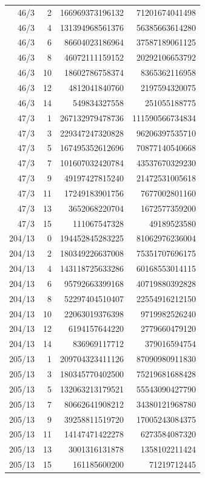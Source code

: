 \begin{longtable}{@{}rrrr@{}}
46/3 & 2 & 166969373196132 & 71201674041498\\
46/3 & 4 & 131394968561376 & 56385663614280\\
46/3 & 6 & 86604023186964 & 37587189061125\\
46/3 & 8 & 46072111159152 & 20292106653792\\
46/3 & 10 & 18602786758374 & 8365362116958\\
46/3 & 12 & 4812041840760 & 2197594320075\\
46/3 & 14 & 549834327558 & 251055188775\\
47/3 & 1 & 267132979478736 & 111590566734834\\
47/3 & 3 & 229347247320828 & 96206397535710\\
47/3 & 5 & 167495352612696 & 70877140540668\\
47/3 & 7 & 101607032420784 & 43537670329230\\
47/3 & 9 & 49197427815240 & 21472531005618\\
47/3 & 11 & 17249183901756 & 7677002801160\\
47/3 & 13 & 3652068220704 & 1672577359200\\
47/3 & 15 & 111067547328 & 49189523580\\
204/13 & 0 & 194452845283225 & 81062976236004\\
204/13 & 2 & 180349226637008 & 75351707696175\\
204/13 & 4 & 143118725633286 & 60168553014115\\
204/13 & 6 & 95792663399168 & 40719880392828\\
204/13 & 8 & 52297404510407 & 22554916212150\\
204/13 & 10 & 22063019376398 & 9719982526240\\
204/13 & 12 & 6194157644220 & 2779660479120\\
204/13 & 14 & 836969117712 & 379016594754\\
205/13 & 1 & 209704323411126 & 87090980911830\\
205/13 & 3 & 180345770402500 & 75219681688428\\
205/13 & 5 & 132063213179521 & 55543090427790\\
205/13 & 7 & 80662641908212 & 34380121968780\\
205/13 & 9 & 39258811519720 & 17005243084375\\
205/13 & 11 & 14147471422278 & 6273584087320\\
205/13 & 13 & 3001316131878 & 1358102211424\\
205/13 & 15 & 161185600200 & 71219712445\\

\end{longtable}
